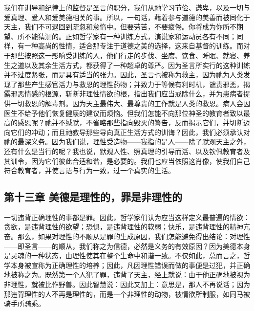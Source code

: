 我们在训导和纪律上的监督是圣言的职分，我们从祂学习节俭、谦卑，以及一切与爱真理、爱人和爱美德相关的事。所以，一句话，藉着参与道德的美善而被同化于天主，我们不可退回到疏忽和怠惰中。但要劳苦，不要疲倦。你将成为你所不期望、所不能猜测的。正如哲学家有一种训练方式，演说家和运动员各有不同；同样，有一种高尚的性情，适合那专注于道德之美的选择，这来自基督的训练。而对于那些按照这一影响受训练的人，他们行走的步伐、坐席、饮食、睡眠、就寝、养生之道以及其余生活方式，都获得了一种超卓的尊严。因为圣言所实行的这种训练并不过度紧张，而是具有适当的张力。因此，圣言也被称为救主，因为祂为人类发现了那些产生感官活力与救恩的理性药物；并致力于等候有利时机，谴责邪恶，揭露邪恶情感的根源，斩断非理性情欲的根，指出我们应当戒除什么，并为患病者提供一切救恩的解毒剂。因为天主最伟大、最尊贵的工作就是人类的救恩。病人会因医生不给予他们恢复健康的建议而烦恼。但我们怎能不向那位神圣的教育者致以最高的感恩呢？祂并不缄默，不省略那些指向毁灭的警告，反而揭示它们，并切断迈向它们的冲动；而且祂教导那些导向真正生活方式的训诲？因此，我们必须承认对祂的最深义务。因为我们说，理性受造物——我指的是人——除了默观天主之外，还有什么是当行的呢？我也说，默观人性、照真理的引导而活、以及钦佩教育者及其训令，因为它们彼此合适和谐，是必要的。我们也应当依照这肖像，使我们自己符合教育者，并使言语与行为一致，过一个真实的生活。\par


\subsection{第十三章 美德是理性的，罪是非理性的}

一切违背正确理性的事都是罪。因此，哲学家们认为应当这样定义最普遍的情欲：贪欲，是违背理性的欲望；恐惧，是违背理性的软弱；快乐，是违背理性的精神亢奋。那么，如果对理性的不顺从是罪的生成原因，我们怎能避免得出结论：对理性——即圣言——的顺从，我们称之为信德，必然是义务的有效原因？因为美德本身是灵魂的一种状态，由理性使其在整个生命中和谐一致。不仅如此，总而言之，哲学本身被宣称为正确理性的培养；因此，凡因理性错误而做的事便是过犯，并正确地被称之为。既然第一个人犯了罪，违背了天主，经上就说：由于他正确地被视为非理性，就被比作野兽。因此智慧说：因此又加上：意思是，那人不再说话；因为那违背理性的人不再是理性的，而是一个非理性的动物，被情欲所制服，如同马被骑手所骑乘。\par


